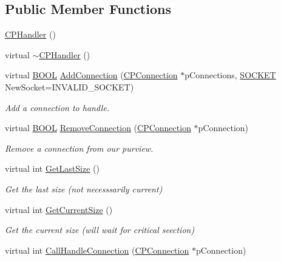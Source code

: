 \subsection*{\-Public \-Member \-Functions}
\begin{DoxyCompactItemize}
\item 
\hyperlink{class_c_p_handler_abc3513acf9f6991bfebf101de8a38895}{\-C\-P\-Handler} ()
\item 
virtual \hyperlink{class_c_p_handler_a83a7da1e9bed8683a9e0e2fa9392f6c0}{$\sim$\-C\-P\-Handler} ()
\item 
virtual \hyperlink{_cpclient_8h_a3be13892ae7076009afcf121347dd319}{\-B\-O\-O\-L} \hyperlink{class_c_p_handler_a0abd34f077a742459ae703aeee7947bc}{\-Add\-Connection} (\hyperlink{class_c_p_connection}{\-C\-P\-Connection} $\ast$p\-Connections, \hyperlink{_x_plat_8h_a8dc8083897335125630f1af5dafd5831}{\-S\-O\-C\-K\-E\-T} \-New\-Socket=\-I\-N\-V\-A\-L\-I\-D\-\_\-\-S\-O\-C\-K\-E\-T)
\begin{DoxyCompactList}\small\item\em \-Add a connection to handle. \end{DoxyCompactList}\item 
virtual \hyperlink{_cpclient_8h_a3be13892ae7076009afcf121347dd319}{\-B\-O\-O\-L} \hyperlink{class_c_p_handler_acd86dd5d6a05124b5c100607aed40bf6}{\-Remove\-Connection} (\hyperlink{class_c_p_connection}{\-C\-P\-Connection} $\ast$p\-Connection)
\begin{DoxyCompactList}\small\item\em \-Remove a connection from our purview. \end{DoxyCompactList}\item 
virtual int \hyperlink{class_c_p_handler_a8f68180d698a456edb91c3e10d8dacc8}{\-Get\-Last\-Size} ()
\begin{DoxyCompactList}\small\item\em \-Get the last size (not necesssarily current) \end{DoxyCompactList}\item 
virtual int \hyperlink{class_c_p_handler_a1610a41117b27ab2805e245eee1a28b1}{\-Get\-Current\-Size} ()
\begin{DoxyCompactList}\small\item\em \-Get the current size (will wait for critical seection) \end{DoxyCompactList}\item 
virtual int \hyperlink{class_c_p_handler_abe1898023c829d3af4b5d1c4efa89479}{\-Call\-Handle\-Connection} (\hyperlink{class_c_p_connection}{\-C\-P\-Connection} $\ast$p\-Connection)
\end{DoxyCompactItemize}
